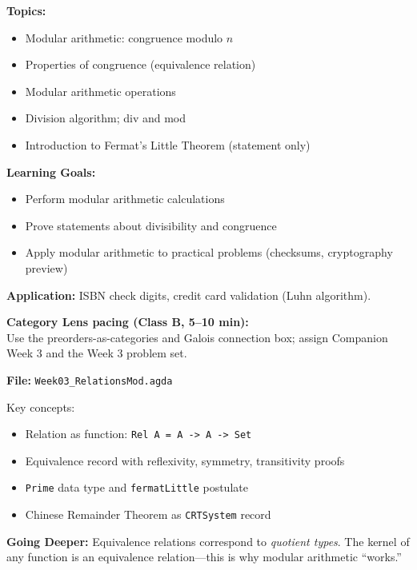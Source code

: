 \documentclass[11pt]{article}
\begin{document}
\begin{classbbox}
\textbf{Topics:}
\begin{itemize}
    \item Modular arithmetic: congruence modulo $n$
    \item Properties of congruence (equivalence relation)
    \item Modular arithmetic operations
    \item Division algorithm; div and mod
    \item Introduction to Fermat's Little Theorem (statement only)
\end{itemize}

\textbf{Learning Goals:}
\begin{itemize}
    \item Perform modular arithmetic calculations
    \item Prove statements about divisibility and congruence
    \item Apply modular arithmetic to practical problems (checksums, cryptography preview)
\end{itemize}

\textbf{Application:} ISBN check digits, credit card validation (Luhn algorithm).
\end{classbbox}

\textbf{Category Lens pacing (Class B, 5--10 min):}\\
Use the preorders-as-categories and Galois connection box; assign Companion Week 3 and the Week 3 problem set.

\begin{agdabox}
\textbf{File:} \texttt{Week03\_RelationsMod.agda}

Key concepts:
\begin{itemize}
    \item Relation as function: \texttt{Rel A = A -> A -> Set}
    \item Equivalence record with reflexivity, symmetry, transitivity proofs
    \item \texttt{Prime} data type and \texttt{fermatLittle} postulate
    \item Chinese Remainder Theorem as \texttt{CRTSystem} record
\end{itemize}

\textbf{Going Deeper:} Equivalence relations correspond to \textit{quotient types}. The kernel of any function is an equivalence relation---this is why modular arithmetic ``works.''
\end{agdabox}
\end{document}
